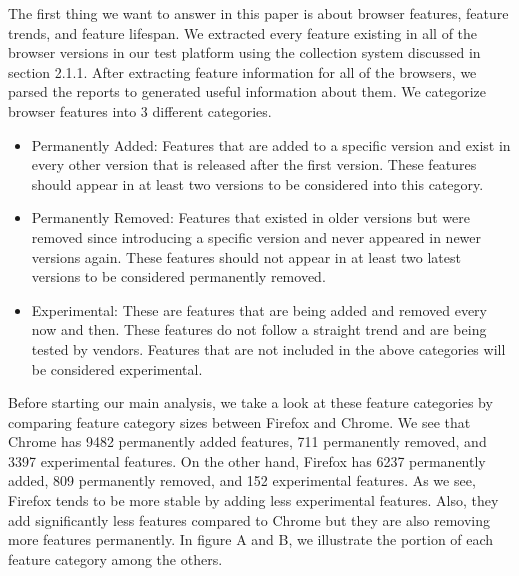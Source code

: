 The first thing we want to answer in this paper is about browser features, feature trends, and feature lifespan. We extracted every feature existing in all of the browser versions in our test platform using the collection system discussed in section 2.1.1. After extracting feature information for all of the browsers, we parsed the reports to generated useful information about them. We categorize browser features into 3 different categories.

\begin{itemize}
    \item Permanently Added: Features that are added to a specific version and exist in every other version that is released after the first version. These features should appear in at least two versions to be considered into this category.
    \item Permanently Removed: Features that existed in older versions but were removed since introducing a specific version and never appeared in newer versions again. These features should not appear in at least two latest versions to be considered permanently removed.
    \item Experimental: These are features that are being added and removed every now and then. These features do not follow a straight trend and are being tested by vendors. Features that are not included in the above categories will be considered experimental.
\end{itemize}

Before starting our main analysis, we take a look at these feature categories by comparing feature category sizes between Firefox and Chrome. We see that Chrome has 9482 permanently added features, 711 permanently removed, and 3397 experimental features. On the other hand, Firefox has 6237 permanently added, 809 permanently removed, and 152 experimental features. As we see, Firefox tends to be more stable by adding less experimental features. Also, they add significantly less features compared to Chrome but they are also removing more features permanently. In figure A and B, we illustrate the portion of each feature category among the others.

